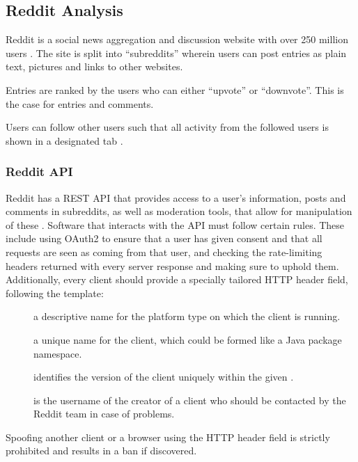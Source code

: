 \subsection{Reddit Analysis}\label{sec:reddit-analysis}
Reddit is a social news aggregation and discussion website with over 250
million users \citep{AdvertiseOnReddit}.
The site is split into ``subreddits'' wherein users can post entries as plain text, pictures and links to other websites. \nl

Entries are ranked by the users who can either ``upvote'' or ``downvote''. This
is the case for entries and comments. \citep{AboutReddit}\nl

Users can follow other users such that all activity from the followed users is
shown in a designated tab .

\subsubsection{Reddit API}\label{subsec:reddit-api}
Reddit has a \ac{REST} \ac{API} that provides access to a user's information,
posts and comments in subreddits, as well as moderation tools, that allow for
manipulation of these \citep{RedditApi}. Software that interacts with the
\ac{API} must follow certain rules. These include using OAuth2 to ensure that a
user has given consent and that all requests are seen as coming from that user,
and checking the rate-limiting headers returned with every server response and
making sure to uphold them.
Additionally, every client should provide a specially tailored 
\ac{HTTP} header field, following the template: \citep{RedditApiRules}\nl

\begin{center}
\end{center}\nl
\begin{description}
  \item[] a descriptive name for the platform type on which the client is running.
  \item[] a unique name for the client, which could be formed like a Java package namespace.
  \item[] identifies the version of the client uniquely
  within the given .
  \item[] is the username of the creator of a client who
  should be contacted by the Reddit team in case of problems.
\end{description}\nl

Spoofing another client or a browser using the  \ac{HTTP} header field is strictly prohibited and
results in a ban if discovered. \citep{RedditApiRules}\nl